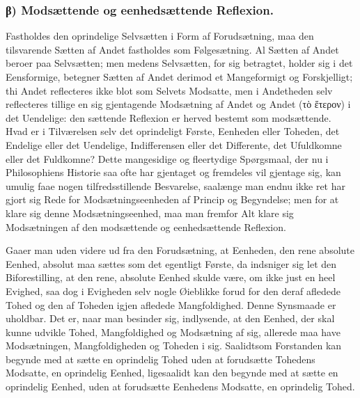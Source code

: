 \documentclass[11pt]{book}
\newcommand{\opage}[1]{\marginnote{\footnotesize\textit{[#1]}}}
\begin{document}
\subsubsection*{β) Modsættende og eenhedsættende Reflexion.}
Fastholdes den oprindelige Selvsætten i Form af Forudsætning, maa den
tilsvarende Sætten af Andet fastholdes som Følgesætning. Al Sætten af Andet
beroer paa Selvsætten; men medens Selvsætten, for sig betragtet, holder sig
i det Eensformige, betegner Sætten af Andet derimod et Mangeformigt og
Forskjelligt; thi Andet reflecteres ikke blot som Selvets Modsatte, men i
Andetheden selv reflecteres tillige en sig gjentagende Modsætning af Andet
og Andet (τὸ ἕτερον) i det Uendelige: den sættende Reflexion er herved
bestemt som modsættende. Hvad er i Tilværelsen selv det oprindeligt Første,
Eenheden eller Toheden, det Endelige eller det Uendelige, Indifferensen
eller det Differente, det Ufuldkomne eller det Fuldkomne? Dette mangesidige
og fleertydige Spørgsmaal, der nu i Philosophiens Historie saa ofte har
gjentaget og fremdeles vil gjentage sig, kan umulig faae nogen
tilfredsstillende Besvarelse, saalænge man endnu ikke ret har gjort sig
Rede for Modsætningseenheden af Princip og Begyndelse; men for at klare sig
denne Modsætningseenhed, maa man fremfor Alt klare sig Modsætningen af den
modsættende og eenhedsættende Reflexion.

\opage{67} \setcounter{footnote}{0}%
Gaaer man uden videre ud fra den Forudsætning, at Eenheden, den rene
absolute Eenhed, absolut maa sættes som det egentligt Første, da indsniger
sig let den Biforestilling, at den rene, absolute Eenhed skulde være, om
ikke just en heel Evighed, saa dog i Evigheden selv nogle Øieblikke forud
for den deraf afledede Tohed og den af Toheden igjen afledede
Mangfoldighed. Denne Synsmaade er uholdbar. Det er, naar man besinder sig,
indlysende, at den Eenhed, der skal kunne udvikle Tohed, Mangfoldighed og
Modsætning af sig, allerede maa have Modsætningen, Mangfoldigheden og
Toheden i sig. Saalidtsom Forstanden kan begynde med at sætte en oprindelig
Tohed uden at forudsætte Tohedens Modsatte, en oprindelig Eenhed,
ligesaalidt kan den begynde med at sætte en oprindelig Eenhed, uden at
forudsætte Eenhedens Modsatte, en oprindelig Tohed.
\end{document}
